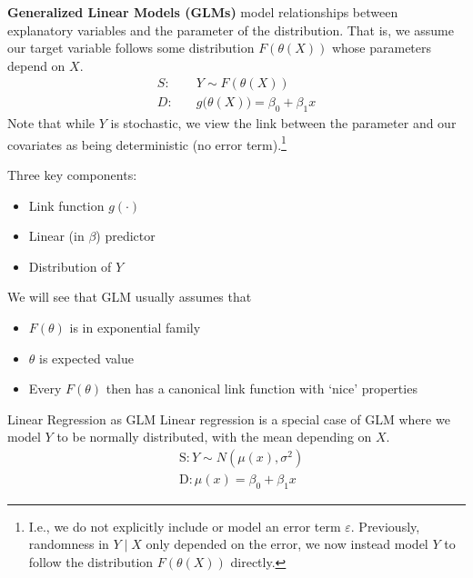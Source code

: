 \documentclass[11pt, %
	oneside, %
	english, %
	onehalfspacing, %
	]{article} %
\numberwithin{equation}{section}
\begin{document}
\textbf{Generalized Linear Models (GLMs)} model relationships between explanatory variables and the parameter of the distribution. That is, we assume our target variable follows some distribution $F(\theta(X))$ whose parameters depend on $X$.
\begin{equation*}
    \begin{aligned}
        S:& \quad Y \sim F(\theta(X)) \\
        D:& \quad  g \big(\theta(X)  \big)= \beta_0 + \beta_1 x
    \end{aligned}
\end{equation*}
Note that while $Y$ is stochastic, we view the link between the parameter and our covariates as being deterministic (no error term).\footnote{I.e., we do not explicitly include or model an error term $\varepsilon$. Previously, randomness in $Y \mid X$ only depended on the error, we now instead model $Y$ to follow the distribution $F(\theta(X))$ directly.}

Three key components:
\begin{itemize}
    \item Link function $g(\cdot)$
    \item Linear (in $\beta$) predictor
    \item Distribution of $Y$
\end{itemize}

We will see that GLM usually assumes that
\begin{itemize}
    \item $F(\theta)$ is in exponential family
    \item $\theta$ is expected value
    \item Every  $F(\theta)$ then has a canonical link function with `nice' properties
\end{itemize}

\begin{example}{Linear Regression as GLM}{}
    Linear regression is a special case of GLM where we model $Y$ to be normally distributed, with the mean depending on $X$.
    \begin{align*}
            & \mathrm{S}: Y \sim N\left(\mu(x), \sigma^2\right) \\
            & \mathrm{D}: \mu(x)=\beta_0+\beta_1 x
    \end{align*}
\end{example}
\end{document}

